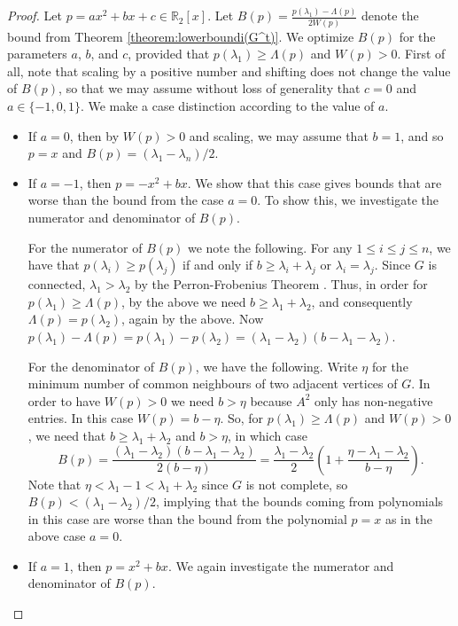\documentclass[10pt,a4paper]{amsart}
\theoremstyle{definition}
\def\R{\mathbb R}
\begin{document}
\setcounter{section}{3}
\setcounter{equation}{0}
\setcounter{theorem}{7}
\begin{proof}
    Let $p=ax^2+bx+c \in \R_2[x]$. Let $B(p)=\frac{p(\lambda_1) - \Lambda(p)}{2W(p)}$ denote the bound from Theorem \ref{theorem:lowerboundi(G^t)}. We optimize $B(p)$ for the parameters $a$, $b$, and $c$, provided that $p(\lambda_1)\ge \Lambda(p)$ and $W(p)>0$. First of all, note that scaling by a positive number and shifting does not change the value of $B(p)$, so that we may assume without loss of generality that $c=0$ and $a\in \{-1,0,1\}$. We make a case distinction according to the value of $a$.
    \begin{itemize}
    \item If $a=0$, then by $W(p)>0$ and scaling, we may assume that $b=1$, and so $p=x$ and $B(p)=(\lambda_1-\lambda_n)/2$.
    \item If $a=-1$, then $p=-x^2+bx$. We show that this case gives bounds that are worse than the bound from the case $a=0$. To show this, we investigate the numerator and denominator of $B(p)$.
    
    For the numerator of $B(p)$ we note the following. For any $1\le i\le j\le n$, we have that $p(\lambda_i)\ge p(\lambda_j)$ if and only if $b\ge \lambda_i+\lambda_j$ or $\lambda_i=\lambda_j$. Since $G$ is connected, $\lambda_1>\lambda_2$ by the Perron-Frobenius Theorem \cite{spectra}. Thus, in order for $p(\lambda_1)\ge \Lambda(p)$, by the above we need $b\ge \lambda_1+\lambda_2$, and consequently $\Lambda(p)=p(\lambda_2)$, again by the above. Now $p(\lambda_1)-\Lambda(p)=p(\lambda_1)-p(\lambda_2)=(\lambda_1-\lambda_2)(b-\lambda_1-\lambda_2)$.

    For the denominator of $B(p)$, we have the following. Write $\eta$ for the minimum number of common neighbours of two adjacent vertices of $G$. In order to have $W(p)>0$ we need $b>\eta$ because $A^2$ only has non-negative entries. In this case $W(p)=b-\eta$.
    So, for $p(\lambda_1)\ge \Lambda(p)$ and $W(p)>0$, we need that $b\ge\lambda_1+\lambda_2$ and $b>\eta$, in which case
    $$B(p)=\frac{(\lambda_1-\lambda_2)(b-\lambda_1-\lambda_2)}{2(b-\eta)}=\frac{\lambda_1-\lambda_2}2 \left (1+\frac{\eta-\lambda_1-\lambda_2}{b-\eta} \right).$$
    Note that $\eta < \lambda_1-1 < \lambda_1+\lambda_2$ since $G$ is not complete, so $B(p)< (\lambda_1-\lambda_2)/2$, implying that the bounds coming from polynomials in this case are worse than the bound from the polynomial $p=x$ as in the above case $a=0$.
    
    \item If $a=1$, then $p=x^2+bx$. We again investigate the numerator and denominator of $B(p)$.


\end{itemize}
\end{proof}
\end{document}
